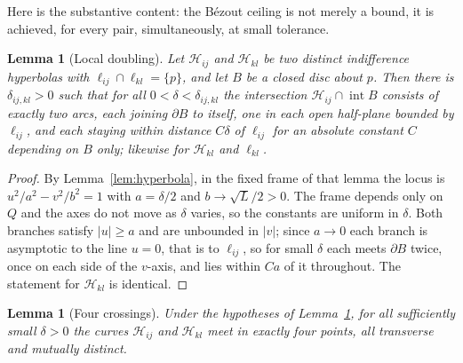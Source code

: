 ﻿\documentclass[11pt,a4paper]{article}
\newtheorem{lemma}[theorem]{Lemma}
\theoremstyle{definition}
\theoremstyle{remark}
\newcommand{\HH}{\mathcal{H}}
\begin{document}
Here is the substantive content: the B\'ezout ceiling is not merely a bound, it
is achieved, for every pair, simultaneously, at small tolerance.

\begin{lemma}[Local doubling]\label{lem:doubling}
Let $\HH_{ij}$ and $\HH_{kl}$ be two distinct indifference hyperbolas with
$\ell_{ij}\cap\ell_{kl}=\{p\}$, and let $B$ be a closed disc about $p$.  Then
there is $\delta_{ij,kl}>0$ such that for all $0<\delta<\delta_{ij,kl}$ the
intersection $\HH_{ij}\cap\operatorname{int}B$ consists of exactly two arcs, each
joining $\partial B$ to itself, one in each open half-plane bounded by
$\ell_{ij}$, and each staying within distance $C\delta$ of $\ell_{ij}$ for an
absolute constant $C$ depending on $B$ only; likewise for $\HH_{kl}$ and
$\ell_{kl}$.
\end{lemma}

\begin{proof}
By Lemma~\ref{lem:hyperbola}, in the fixed frame of that lemma the locus is
$u^2/a^2-v^2/b^2=1$ with $a=\delta/2$ and $b\to\sqrt L/2>0$.  The frame depends
only on $Q$ and the axes do not move as $\delta$ varies, so the constants are
uniform in $\delta$.  Both branches satisfy $|u|\ge a$ and are unbounded in
$|v|$; since $a\to0$ each branch is asymptotic to the line $u=0$, that is to
$\ell_{ij}$, so for small $\delta$ each meets $\partial B$ twice, once on each
side of the $v$-axis, and lies within $C a$ of it throughout.  The statement for
$\HH_{kl}$ is identical.
\end{proof}

\begin{lemma}[Four crossings]\label{lem:four}
Under the hypotheses of Lemma~\ref{lem:doubling}, for all sufficiently small
$\delta>0$ the curves $\HH_{ij}$ and $\HH_{kl}$ meet in exactly four points, all
transverse and mutually distinct.
\end{lemma}
\end{document}
